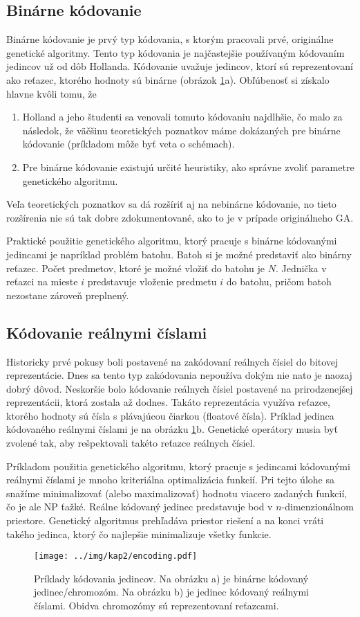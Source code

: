 \subsection{Binárne kódovanie}\label{kap2:2.2:2.2.1:Binary}
Binárne kódovanie je prvý typ kódovania, s ktorým pracovali prvé, originálne genetické algoritmy.
Tento typ kódovania je najčastejšie používaným kódovaním jedincov už od dôb Hollanda. Kódovanie uvažuje jedincov, ktorí sú reprezentovaní ako reťazec, ktorého hodnoty sú binárne (obrázok \ref{fig:Encoding}a). Obľúbenosť si získalo hlavne kvôli tomu, že 
\begin{enumerate}
\item Holland a jeho študenti sa venovali tomuto kódovaniu najdlhšie, čo malo za následok, že väčšinu teoretických poznatkov máme dokázaných pre binárne kódovanie (príkladom môže byť veta o schémach).
\item Pre binárne kódovanie existujú určité heuristiky, ako správne zvoliť parametre genetického algoritmu.
\end{enumerate}
Veľa teoretických poznatkov sa dá rozšíriť aj na nebinárne kódovanie, no tieto rozšírenia nie sú tak dobre zdokumentované, ako to je v prípade originálneho GA.

Praktické použitie genetického algoritmu, ktorý pracuje s binárne kódovanými jedincami je napríklad problém batohu. Batoh si je možné predstaviť ako binárny reťazec. Počet predmetov, ktoré je možné vložiť do batohu je $N$. Jednička v reťazci na mieste $i$ predstavuje vloženie predmetu $i$ do batohu, pričom batoh nezostane zároveň preplnený.
\subsection{Kódovanie reálnymi číslami}\label{kap2:2.2:2.2.2:RealValued}
Historicky prvé pokusy boli postavené na zakódovaní reálnych čísiel do bitovej reprezentácie. Dnes sa tento typ zakódovania nepoužíva dokým nie nato je naozaj dobrý dôvod. Neskoršie bolo kódovanie reálnych čísiel postavené na prirodzenejšej reprezentácii, ktorá zostala až dodnes. Takáto reprezentácia využíva reťazce, ktorého hodnoty sú čísla s plávajúcou čiarkou (floatové čísla).
Príklad jedinca kódovaného reálnymi číslami je na obrázku \ref{fig:Encoding}b. Genetické operátory musia byť zvolené tak, aby rešpektovali takéto reťazce reálnych čísiel.

Príkladom použitia genetického algoritmu, ktorý pracuje s jedincami kódovanými reálnymi číslami je mnoho kriteriálna optimalizácia funkcií. Pri tejto úlohe sa snažíme minimalizovať (alebo maximalizovať) hodnotu viacero zadaných funkcií, čo je ale NP ťažké. Reálne kódovaný jedinec predstavuje bod v $n$-dimenzionálnom priestore. Genetický algoritmus prehľadáva priestor riešení a na konci vráti takého jedinca, ktorý čo najlepšie minimalizuje všetky funkcie.
\begin{figure}[h]
\centering
\centerline{\mbox{\texttt{[image: ../img/kap2/encoding.pdf]}}}
\caption{Príklady kódovania jedincov. Na obrázku a) je binárne kódovaný jedinec/chromozóm. Na obrázku b) je jedinec kódovaný reálnymi číslami. Obidva chromozómy sú reprezentovaní reťazcami.}\label{fig:Encoding}
\end{figure}

